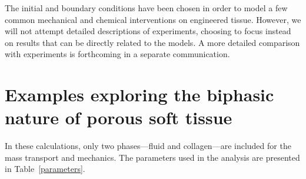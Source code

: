 The initial and boundary
conditions have been chosen in order to model a few common mechanical and
chemical interventions on engineered tissue. However, we will not
attempt detailed descriptions of experiments, choosing to focus
instead on results that can be directly related to the models. A more
detailed comparison with experiments is forthcoming in a separate
communication.



\section{Examples exploring the biphasic nature of porous soft tissue}
\label{biphasic-examples-1}

In these calculations, only two phases---fluid and collagen---are
included for the mass transport and mechanics. The parameters used in the analysis
are presented in Table~\ref{parameters}. 









